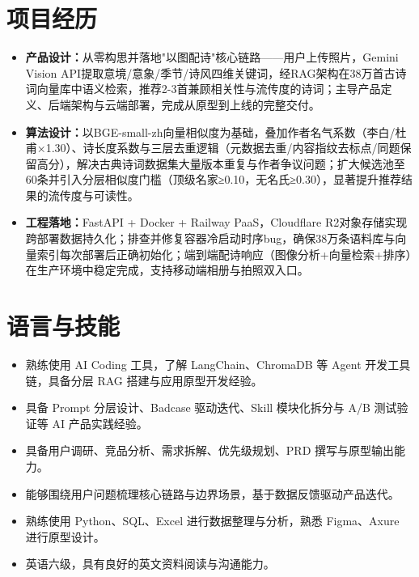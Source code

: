 \documentclass{resume}
\begin{document}
\section{项目经历}

\begin{itemize}[parsep=0.5ex]
  \item \textbf{产品设计：}从零构思并落地"以图配诗"核心链路——用户上传照片，Gemini Vision API提取意境/意象/季节/诗风四维关键词，经RAG架构在38万首古诗词向量库中语义检索，推荐2-3首兼顾相关性与流传度的诗词；主导产品定义、后端架构与云端部署，完成从原型到上线的完整交付。
  \item \textbf{算法设计：}以BGE-small-zh向量相似度为基础，叠加作者名气系数（李白/杜甫×1.30）、诗长度系数与三层去重逻辑（元数据去重/内容指纹去标点/同题保留高分），解决古典诗词数据集大量版本重复与作者争议问题；扩大候选池至60条并引入分层相似度门槛（顶级名家≥0.10，无名氏≥0.30），显著提升推荐结果的流传度与可读性。
  \item \textbf{工程落地：}FastAPI + Docker + Railway PaaS，Cloudflare R2对象存储实现跨部署数据持久化；排查并修复容器冷启动时序bug，确保38万条语料库与向量索引每次部署后正确初始化；端到端配诗响应（图像分析+向量检索+排序）在生产环境中稳定完成，支持移动端相册与拍照双入口。
\end{itemize}

\section{语言与技能}

\begin{itemize}[parsep=0.5ex]
  \item 熟练使用 AI Coding 工具，了解 LangChain、ChromaDB 等 Agent 开发工具链，具备分层 RAG 搭建与应用原型开发经验。
  \item 具备 Prompt 分层设计、Badcase 驱动迭代、Skill 模块化拆分与 A/B 测试验证等 AI 产品实践经验。
  \item 具备用户调研、竞品分析、需求拆解、优先级规划、PRD 撰写与原型输出能力。
  \item 能够围绕用户问题梳理核心链路与边界场景，基于数据反馈驱动产品迭代。
  \item 熟练使用 Python、SQL、Excel 进行数据整理与分析，熟悉 Figma、Axure 进行原型设计。
  \item 英语六级，具有良好的英文资料阅读与沟通能力。
\end{itemize}
\end{document}
